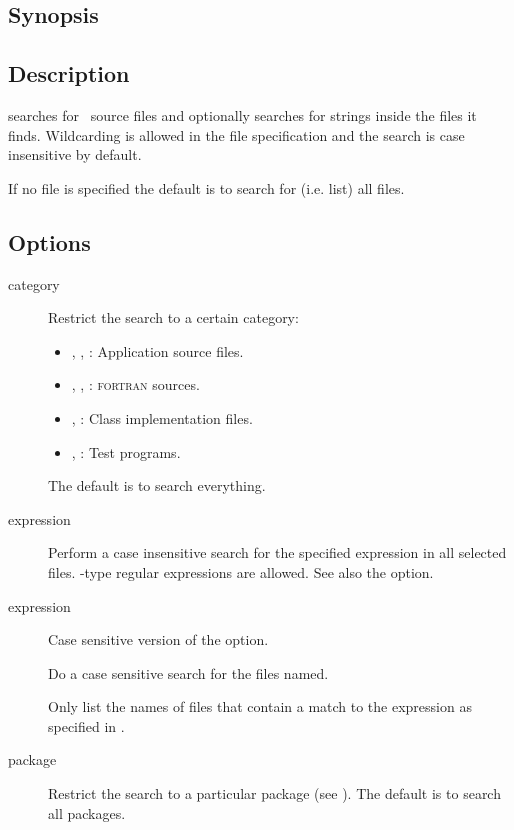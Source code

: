 \subsection*{Synopsis}

\begin{synopsis}
\end{synopsis}

\subsection*{Description}

 searches for \aipspp\ source files and optionally searches for
strings inside the files it finds.  Wildcarding is allowed in the file
specification and the search is case insensitive by default.

If no file is specified the default is to search for (i.e. list) all files.

\subsection*{Options}

\begin{description}
\item[ category]
   Restrict the search to a certain category:
   \begin{itemize}
      \item
      , , : Application source files.

      \item
      , , : \textsc{fortran} sources.

      \item
      , : Class implementation files.

      \item
      , : Test programs.
   \end{itemize}
   The default is to search everything.

\item[ expression]
   Perform a case insensitive search for the specified expression in all
   selected files.  -type regular expressions are allowed.
   See also the  option.

\item[ expression]
   Case sensitive version of the  option.

\item[]
   Do a case sensitive search for the files named.

\item[]
   Only list the names of files that contain a match to the expression 
   as specified in .

\item[ package]
   Restrict the search to a particular package (see ).
   The default is to search all packages.
\end{description}

